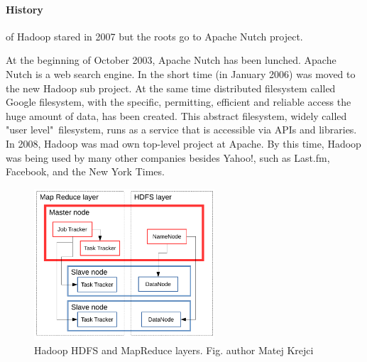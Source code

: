 \documentclass[a4paper,12pt,oneside]{report}
\begin{document}
	\paragraph*{History} of Hadoop stared in 2007 but the roots go
	to Apache Nutch project. 
	
	At the beginning of October 2003, Apache Nutch\cite{nutch_web} has been lunched.
	Apache Nutch is a  web search engine. In the short time (in January 2006) was
	moved to the new Hadoop sub project.
	At the same time  distributed filesystem called Google
	filesystem\cite{google_fs}, with the specific, permitting, efficient and
	reliable access	the huge amount of data, has been created. This abstract filesystem, widely
	called "user level"~filesystem, runs as a service that is accessible via APIs and libraries. 
	In 2008, Hadoop was mad own top-level project at Apache.\cite{hadoop_news_web}
	By this time, Hadoop was being used by many
	other companies besides Yahoo!, such as Last.fm, Facebook, and the New York
	Times. 
	
	\begin{figure}[!htbp]
		\centering
		\includegraphics[width=0.6\textwidth]{./img/schema2.pdf}
		\caption[Hadoop architecture2]{\centering Hadoop HDFS and MapReduce layers. Fig. author Matej Krejci}
	\end{figure} 
	
	
	
\end{document}
